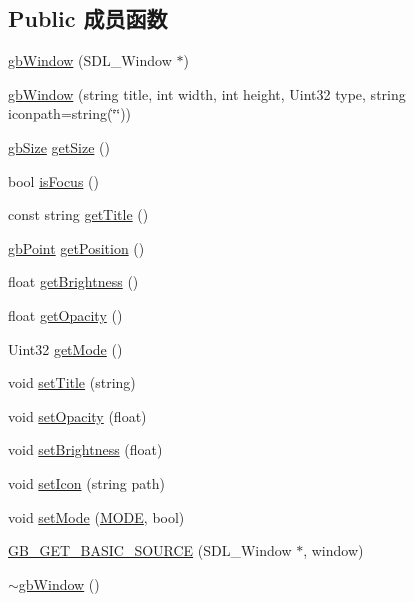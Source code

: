 \subsection*{Public 成员函数}
\begin{DoxyCompactItemize}
\item 
\mbox{\hyperlink{classgb_window_a08e5afeb1a8c049610b57be380b6403a}{gb\+Window}} (S\+D\+L\+\_\+\+Window $\ast$)
\item 
\mbox{\hyperlink{classgb_window_a16cf72cd91e250f47f6b052d66f71d27}{gb\+Window}} (string title, int width, int height, Uint32 type, string iconpath=string(\char`\"{}\char`\"{}))
\item 
\mbox{\hyperlink{classgb_size}{gb\+Size}} \mbox{\hyperlink{classgb_window_a0a5f9d324a9d81167d9e7b1721587ec4}{get\+Size}} ()
\item 
bool \mbox{\hyperlink{classgb_window_abda1af6601c41ace2731cfeff9312927}{is\+Focus}} ()
\item 
const string \mbox{\hyperlink{classgb_window_a470388bdcea1c7ed3ee77ddb9ecb5a46}{get\+Title}} ()
\item 
\mbox{\hyperlink{classgb_point}{gb\+Point}} \mbox{\hyperlink{classgb_window_a694817c835e86e52cb18c5d70726ca1c}{get\+Position}} ()
\item 
float \mbox{\hyperlink{classgb_window_a285d24584544d223e18078a60882109c}{get\+Brightness}} ()
\item 
float \mbox{\hyperlink{classgb_window_a783ba0e2f72c27f844105909d54b5f5f}{get\+Opacity}} ()
\item 
Uint32 \mbox{\hyperlink{classgb_window_ac29791f5fd5be28d4e08d2d64f220aa1}{get\+Mode}} ()
\item 
void \mbox{\hyperlink{classgb_window_ab7a05f81b0191dbccafc897287d1b759}{set\+Title}} (string)
\item 
void \mbox{\hyperlink{classgb_window_a4a89c22270c639142295477ab37e838f}{set\+Opacity}} (float)
\item 
void \mbox{\hyperlink{classgb_window_ad05c721b3e04f23f0e6b72e4c411be1c}{set\+Brightness}} (float)
\item 
void \mbox{\hyperlink{classgb_window_ae23cb1d0f10770397014d812c4339e01}{set\+Icon}} (string path)
\item 
void \mbox{\hyperlink{classgb_window_a78354f1a4f6ed885c055e5b14ab005a6}{set\+Mode}} (\mbox{\hyperlink{classgb_window_a19e70d277e17598ddb3c229e28dbb9e9}{M\+O\+DE}}, bool)
\item 
\mbox{\hyperlink{classgb_window_a7a24cdcd80201982dca8944b073a76f9}{G\+B\+\_\+\+G\+E\+T\+\_\+\+B\+A\+S\+I\+C\+\_\+\+S\+O\+U\+R\+CE}} (S\+D\+L\+\_\+\+Window $\ast$, window)
\item 
\mbox{\hyperlink{classgb_window_acd0d49bdf1dbe7df86e02ba82a318571}{$\sim$gb\+Window}} ()
\end{DoxyCompactItemize}


